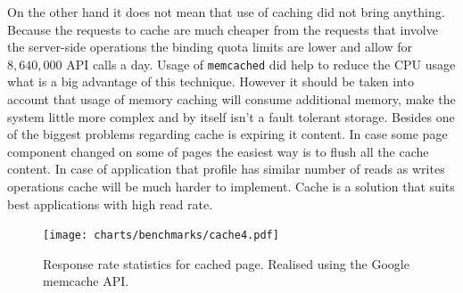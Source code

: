 

On the other hand it does not mean that use of caching did not bring anything. Because the requests to cache are much cheaper from the requests that involve the server-side operations the binding quota limits are lower and allow for $8,640,000$ API calls a day. Usage of \texttt{memcached} did help to reduce the CPU usage what is a big advantage of this technique. However it should be taken into account that usage of memory caching will consume additional memory, make the system little more complex and by itself isn't a fault tolerant storage. Besides one of the biggest problems regarding cache is expiring it content. In case some page component changed on some of pages the easiest way is to flush all the cache content. In case of application that profile has similar number of reads as writes operations cache will be much harder to implement. Cache is a  solution that suits best applications with high read rate.      
\begin{figure}[ht]
  \begin{center}
	\texttt{[image: charts/benchmarks/cache4.pdf]}
  \end{center}
  \caption{Response rate statistics for cached page. Realised using the Google memcache API.}
  \label{fig:sm_benchmark_cache}
\end{figure}

